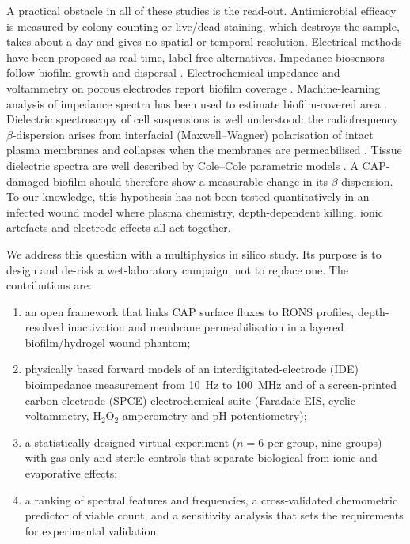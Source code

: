 \documentclass[pdflatex,sn-mathphys-num]{sn-jnl}%
\begin{document}
A practical obstacle in all of these studies is the read-out. Antimicrobial efficacy is measured by colony counting or live/dead staining, which destroys the sample, takes about a day and gives no spatial or temporal resolution. Electrical methods have been proposed as real-time, label-free alternatives. Impedance biosensors follow biofilm growth and dispersal \cite{mcglennen2023,kumar2023}. Electrochemical impedance and voltammetry on porous electrodes report biofilm coverage \cite{oconnorf2025}. Machine-learning analysis of impedance spectra has been used to estimate biofilm-covered area \cite{xu2019}. Dielectric spectroscopy of cell suspensions is well understood: the radiofrequency $\beta$-dispersion arises from interfacial (Maxwell--Wagner) polarisation of intact plasma membranes and collapses when the membranes are permeabilised \cite{asami2002,markx1999,grimes2015}. Tissue dielectric spectra are well described by Cole--Cole parametric models \cite{cole1941,gabriel1996b,gabriel1996c}. A CAP-damaged biofilm should therefore show a measurable change in its $\beta$-dispersion. To our knowledge, this hypothesis has not been tested quantitatively in an infected wound model where plasma chemistry, depth-dependent killing, ionic artefacts and electrode effects all act together.

We address this question with a multiphysics in silico study. Its purpose is to design and de-risk a wet-laboratory campaign, not to replace one. The contributions are:
\begin{enumerate}
\item an open framework that links CAP surface fluxes to RONS profiles, depth-resolved inactivation and membrane permeabilisation in a layered biofilm/hydrogel wound phantom;
\item physically based forward models of an interdigitated-electrode (IDE) bioimpedance measurement from \SI{10}{\hertz} to \SI{100}{\mega\hertz} and of a screen-printed carbon electrode (SPCE) electrochemical suite (Faradaic EIS, cyclic voltammetry, H$_2$O$_2$ amperometry and pH potentiometry);
\item a statistically designed virtual experiment ($n=6$ per group, nine groups) with gas-only and sterile controls that separate biological from ionic and evaporative effects;
\item a ranking of spectral features and frequencies, a cross-validated chemometric predictor of viable count, and a sensitivity analysis that sets the requirements for experimental validation.
\end{enumerate}
\end{document}
